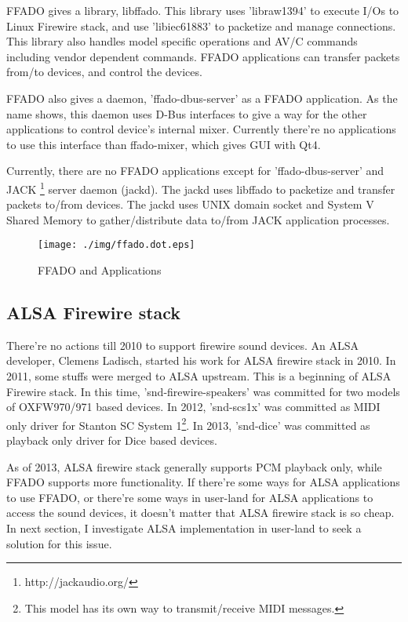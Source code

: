 \documentclass[onecolumn]{article}
\begin{document}
FFADO gives a library, libffado. This library uses 'libraw1394' to execute I/Os to Linux Firewire stack, and use 'libiec61883' to packetize and manage connections. This library also handles model specific operations and AV/C commands including vendor dependent commands. FFADO applications can transfer packets from/to devices, and control the devices.

FFADO also gives a daemon, 'ffado-dbus-server' as a FFADO application. As the name shows, this daemon uses D-Bus interfaces to give a way for the other applications to control device's internal mixer. Currently there're no applications to use this interface than ffado-mixer, which gives GUI with Qt4.

Currently, there are no FFADO applications except for 'ffado-dbus-server' and JACK \footnote{http://jackaudio.org/} server daemon (jackd). The jackd uses libffado to packetize and transfer packets to/from devices. The jackd uses UNIX domain socket and System V Shared Memory to gather/distribute data to/from JACK application processes. 

\begin{figure}[H]
	\centering
	\texttt{[image: ./img/ffado.dot.eps]}
	\caption{{FFADO and Applications}}
	\label{ffado_apps}
\end{figure}

\subsection{ALSA Firewire stack}
There're no actions till 2010 to support firewire sound devices. An ALSA developer, Clemens Ladisch, started his work for ALSA firewire stack in 2010. In 2011, some stuffs were merged to ALSA upstream. This is a beginning of ALSA Firewire stack. In this time, 'snd-firewire-speakers' was committed for two models of OXFW970/971 based devices. In 2012, 'snd-scs1x' was committed as MIDI only driver for Stanton SC System 1\footnote{This model has its own way to transmit/receive MIDI messages.}. In 2013, 'snd-dice' was committed as playback only driver for Dice based devices.

As of 2013, ALSA firewire stack generally supports PCM playback only, while FFADO supports more functionality. If there're some ways for ALSA applications to use FFADO, or there're some ways in user-land for ALSA applications to access the sound devices, it doesn't matter that ALSA firewire stack is so cheap. In next section, I investigate ALSA implementation in user-land to seek a solution for this issue.
\end{document}
